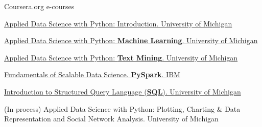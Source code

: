 

\begin{cventries}


  \cventry
    {Coursera.org} %
    {e-courses} %
    {} %
    {} %
    {
      \begin{cvitems} %
        \item {\href{https://coursera.org/share/e987dd1af249aa17a3886a3dcb12f5e5}{Applied Data Science with Python:  Introduction. University of Michigan}}
         \item {\href{https://coursera.org/share/6c2e38d3716e3829c14f72c6565962dd}{Applied Data Science with Python: \textbf{Machine Learning}. University of Michigan}}
          \item {\href{https://coursera.org/share/0070224c71f972592c35b3809cab31f4}{Applied Data Science with Python: \textbf{Text Mining}. University of Michigan}} 
          \item {\href{https://coursera.org/share/262a0477359d288dbddb891f516993c2}{Fundamentals of Scalable Data Science. \textbf{PySpark}. IBM}}
           \item {\href{https://coursera.org/share/b409b2940d13796f147b88e7a1f894bf}{Introduction to Structured Query Language (\textbf{SQL}). University of Michigan}}
          \item {(In process) Applied Data Science with Python: Plotting, Charting \& Data Representation and Social Network Analysis. University of Michigan}
      \end{cvitems}
    }
\end{cventries}
